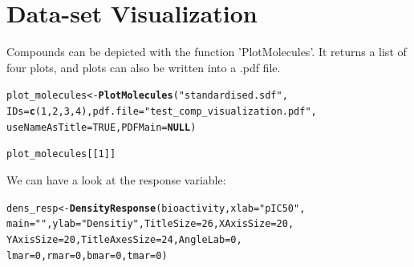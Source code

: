 \documentclass[twoside,a4wide,12pt]{article}\usepackage[]{graphicx}\usepackage[]{color}
\makeatletter
\newcommand{\hlnum}[1]{\textcolor[rgb]{0.686,0.059,0.569}{#1}}%
\newcommand{\hlstr}[1]{\textcolor[rgb]{0.192,0.494,0.8}{#1}}%
\newcommand{\hlstd}[1]{\textcolor[rgb]{0.345,0.345,0.345}{#1}}%
\newcommand{\hlkwa}[1]{\textcolor[rgb]{0.161,0.373,0.58}{\textbf{#1}}}%
\newcommand{\hlkwb}[1]{\textcolor[rgb]{0.69,0.353,0.396}{#1}}%
\newcommand{\hlkwc}[1]{\textcolor[rgb]{0.333,0.667,0.333}{#1}}%
\newcommand{\hlkwd}[1]{\textcolor[rgb]{0.737,0.353,0.396}{\textbf{#1}}}%
\newenvironment{kframe}{%
 \def\at@end@of@kframe{}%
 \ifinner\ifhmode%
  \def\at@end@of@kframe{\end{minipage}}%
  \begin{minipage}{\columnwidth}%
 \fi\fi%
 \def\FrameCommand##1{\hskip\@totalleftmargin \hskip-\fboxsep
 \colorbox{shadecolor}{##1}\hskip-\fboxsep
     \hskip-\linewidth \hskip-\@totalleftmargin \hskip\columnwidth}%
 \MakeFramed {\advance\hsize-\width
   \@totalleftmargin\z@ \linewidth\hsize
   \@setminipage}}%
 {\par\unskip\endMakeFramed%
 \at@end@of@kframe}
\newenvironment{knitrout}{}{} %
\makeatother
\begin{document}
\section{Data-set Visualization}
Compounds can be depicted with the function 'PlotMolecules'. It returns a list of four plots, and plots can also be written into a .pdf file.
\begin{knitrout}
\color{fgcolor}\begin{kframe}
\begin{alltt}
\hlstd{plot_molecules} \hlkwb{<-} \hlkwd{PlotMolecules}\hlstd{(}\hlstr{"standardised.sdf"}\hlstd{,}
    \hlkwc{IDs} \hlstd{=} \hlkwd{c}\hlstd{(}\hlnum{1}\hlstd{,} \hlnum{2}\hlstd{,} \hlnum{3}\hlstd{,} \hlnum{4}\hlstd{),} \hlkwc{pdf.file} \hlstd{=} \hlstr{"test_comp_visualization.pdf"}\hlstd{,}
    \hlkwc{useNameAsTitle} \hlstd{=} \hlnum{TRUE}\hlstd{,} \hlkwc{PDFMain} \hlstd{=} \hlkwa{NULL}\hlstd{)}
\end{alltt}


{\ttfamily\noindent\bfseries\color{errorcolor}{\#\# Error: unused argument (useNameAsTitle = TRUE)}}\begin{alltt}
\hlstd{plot_molecules[[}\hlnum{1}\hlstd{]]}
\end{alltt}


{\ttfamily\noindent\bfseries\color{errorcolor}{\#\# Error: object 'plot\_molecules' not found}}\end{kframe}
\end{knitrout}


We can have a look at the response variable:
\begin{knitrout}
\color{fgcolor}\begin{kframe}
\begin{alltt}
\hlstd{dens_resp} \hlkwb{<-} \hlkwd{DensityResponse}\hlstd{(bioactivity,} \hlkwc{xlab} \hlstd{=} \hlstr{"pIC50"}\hlstd{,}
    \hlkwc{main} \hlstd{=} \hlstr{""}\hlstd{,} \hlkwc{ylab} \hlstd{=} \hlstr{"Densitiy"}\hlstd{,} \hlkwc{TitleSize} \hlstd{=} \hlnum{26}\hlstd{,} \hlkwc{XAxisSize} \hlstd{=} \hlnum{20}\hlstd{,}
    \hlkwc{YAxisSize} \hlstd{=} \hlnum{20}\hlstd{,} \hlkwc{TitleAxesSize} \hlstd{=} \hlnum{24}\hlstd{,} \hlkwc{AngleLab} \hlstd{=} \hlnum{0}\hlstd{,}
    \hlkwc{lmar} \hlstd{=} \hlnum{0}\hlstd{,} \hlkwc{rmar} \hlstd{=} \hlnum{0}\hlstd{,} \hlkwc{bmar} \hlstd{=} \hlnum{0}\hlstd{,} \hlkwc{tmar} \hlstd{=} \hlnum{0}\hlstd{)}
\end{alltt}
\end{kframe}
\end{knitrout}
\end{document}
